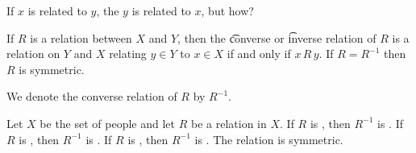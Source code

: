 

If $x$ is related to $y$, the $y$ is related to $x$, but how?


If $R$ is a relation between $X$ and $Y$, then the \t{converse} or \t{inverse} relation of $R$ is a relation on $Y$ and $X$ relating $y \in Y$ to $x \in X$ if and only if $x\,R\,y$.
If $R = R^{-1}$ then $R$ is symmetric.



We denote the converse relation of $R$ by $R^{-1}$.


Let $X$ be the set of people and let $R$ be a relation in $X$.
If $R$ is , then $R^{-1}$ is .
If $R$ is , then $R^{-1}$ is .
If $R$ is , then $R^{-1}$ is .
The relation  is symmetric.

\blankpage
